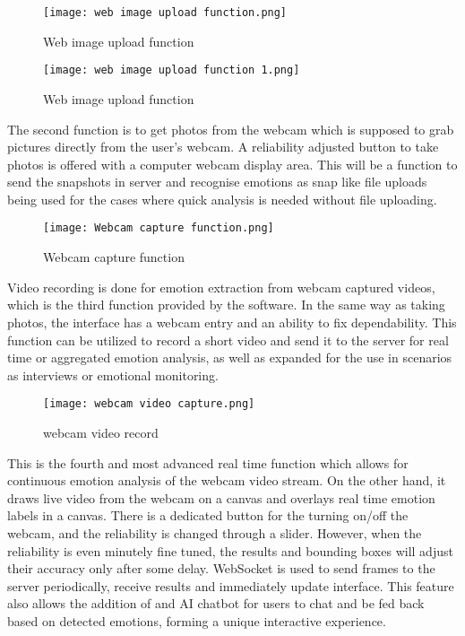 \documentclass[a4paper,13pt]{report}
\begin{document}
\begin{figure}[H]
  \centering
  \texttt{[image: web image upload function.png]}
  \caption{Web image upload function}
  \label{fig:result}
\end{figure}

\begin{figure}[H]
  \centering
  \texttt{[image: web image upload function 1.png]}
  \caption{Web image upload function}
  \label{fig:result}
\end{figure}

The second function is to get photos from the webcam which is supposed to grab pictures directly from the user’s webcam. A reliability adjusted button to take photos is offered with a computer webcam display area. This will be a function to send the snapshots in server and recognise emotions as snap like file uploads being used for the cases where quick analysis is needed without file uploading.

\begin{figure}[H]
  \centering
  \texttt{[image: Webcam capture function.png]}
  \caption{Webcam capture function}
  \label{fig:method}
\end{figure}

\newpage Video recording is done for emotion extraction from webcam captured videos, which is the third function provided by the software. In the same way as taking photos, the interface has a webcam entry and an ability to fix dependability. This function can be utilized to record a short video and send it to the server for real time or aggregated emotion analysis, as well as expanded for the use in scenarios as interviews or emotional monitoring.

\begin{figure}[H]
  \centering
  \texttt{[image: webcam video capture.png]}
  \caption{webcam video record}
  \label{fig:method}
\end{figure}

This is the fourth and most advanced real time function which allows for continuous emotion analysis of the webcam video stream. On the other hand, it draws live video from the webcam on a canvas and overlays real time emotion labels in a canvas. There is a dedicated button for the turning on/off the webcam, and the reliability is changed through a slider. However, when the reliability is even minutely fine tuned, the results and bounding boxes will adjust their accuracy only after some delay. WebSocket is used to send frames to the server periodically, receive results and immediately update interface. This feature also allows the addition of and AI chatbot for users to chat and be fed back based on detected emotions, forming a unique interactive experience.
\end{document}
